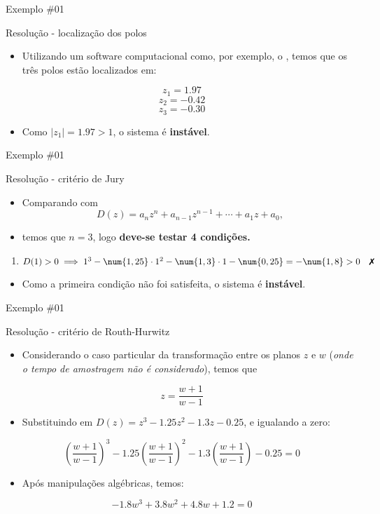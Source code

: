\begin{frame}{Exemplo \#01}
\begin{block}{Resolução - localização dos polos}
\begin{itemize}
    \item Utilizando um software computacional como, por exemplo, o \MATLAB, temos que os três polos estão localizados em:
\end{itemize}
$$z_1 = \num{1,97}$$
$$z_2 = -\num{0,42}$$
$$z_3 = -\num{0,30}$$
\begin{itemize}
    \item Como $|z_1| = \num{1,97} > 1$, o sistema é \textbf{instável}.
\end{itemize}
\end{block}
\end{frame}

\begin{frame}{Exemplo \#01}
\begin{block}{Resolução - critério de Jury}
\begin{itemize}
	\item Comparando com 
	$$D(z) = a_{n}z^{n}+a_{n-1}z^{n-1}+\cdots+a_{1}z+a_{0},$$
\end{itemize}
\begin{itemize}
    \item[] temos que $n=3$, logo \textbf{deve-se testar 4 condições.}
\end{itemize}
\begin{enumerate}[(1)]
	\item $D(1)>0 \implies 1^{3}-\num{1,25}\cdot1^{2}-\num{1,3}\cdot1-\num{0,25}=-\num{1,8}>0 \quad \text{\xmark}$
\end{enumerate}
\begin{itemize}
    \item Como a primeira condição não foi satisfeita, o sistema é \textbf{instável}.
\end{itemize}
\end{block}
\end{frame}

\begin{frame}{Exemplo \#01}
\begin{block}{Resolução - critério de Routh-Hurwitz}
\begin{itemize}
	\item Considerando o caso particular da transformação entre os planos $z$ e $w$ (\textit{onde o tempo de amostragem não é considerado}), temos que
\end{itemize}
$$z = \dfrac{w+1}{w-1}$$
\begin{itemize}
    \item Substituindo em $D(z)=z^{3}-\num{1,25}z^{2}-\num{1,3}z-\num{0,25}$, e igualando a zero:
\end{itemize}
$$\left(\dfrac{w+1}{w-1}\right)^3 - \num{1,25}\left(\dfrac{w+1}{w-1}\right)^2 - \num{1,3}\left(\dfrac{w+1}{w-1}\right) - \num{0,25} = 0$$
\begin{itemize}
    \item Após manipulações algébricas, temos:
\end{itemize}
$$-\num{1,8}w^{3}+\num{3,8}w^{2}+\num{4,8}w+\num{1,2} = 0$$
\end{block}
\end{frame}

